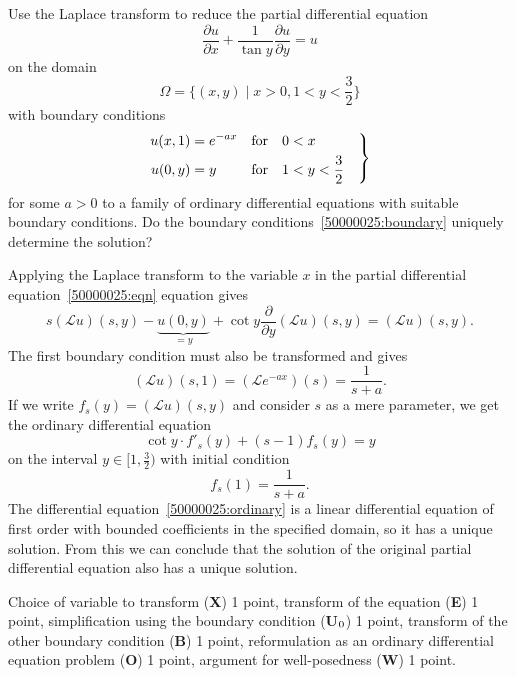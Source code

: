 Use the Laplace transform to reduce the partial differential equation
\begin{equation}
\frac{\partial u}{\partial x}
+
\frac{1}{\tan y}\frac{\partial u}{\partial y}
=
u
\label{50000025:eqn}
\end{equation}
on the domain
\[
\Omega
=
\biggl\{
(x,y)
\;\bigg|\;
x > 0, 1 < y < \frac32
\biggr\}
\]
with boundary conditions
\begin{equation}
\left.
\begin{aligned}
u(x,1) &= e^{-ax} &&\text{for} & 0<\mathstrut&x\\
u(0,y) &= y       &&\text{for} & 1<\mathstrut&y<\frac32
\end{aligned}
\quad\right\}
\label{50000025:boundary}
\end{equation}
for some $a>0$
to a family of ordinary differential equations with suitable boundary
conditions.
Do the boundary conditions~\eqref{50000025:boundary} uniquely determine
the solution?

\begin{loesung}
Applying the Laplace transform to the variable $x$ in the partial
differential equation~\eqref{50000025:eqn} equation gives
\[
s(\mathscr{L}u)(s,y)
-
\underbrace{u(0,y)}_{\displaystyle=y}
+
\cot y \frac{\partial}{\partial y}(\mathscr{L}u)(s,y)
=
(\mathscr{L}u)(s,y).
\]
The first boundary condition must also be transformed and gives
\[
(\mathscr{L}u)(s,1)
=
(\mathscr{L}e^{-ax})(s)
=
\frac{1}{s+a}.
\]
If we write $f_s(y)=(\mathscr{L}u)(s,y)$ and consider $s$ as a mere
parameter, we get the ordinary differential equation
\begin{equation}
\cot y \cdot f'_s(y) 
+(s-1) f_s(y)
=
y
\label{50000025:ordinary}
\end{equation}
on the interval $y\in [1,\frac32)$ with initial condition
\[
f_s(1) = \frac{1}{s+a}.
\]
The differential equation~\eqref{50000025:ordinary} is a linear
differential equation of first order with bounded coefficients
in the specified domain, so it has a unique solution.
From this we can conclude that the solution of the original 
partial differential equation also has a unique solution.
\end{loesung}

\begin{bewertung}
Choice of variable to transform ({\bf X}) 1 point,
transform of the equation ({\bf E}) 1 point,
simplification using the boundary condition ({\bf U}$\mathstrut_0$) 1 point,
transform of the other boundary condition ({\bf B}) 1 point,
reformulation as an ordinary differential equation problem ({\bf O}) 1 point,
argument for well-posedness ({\bf W}) 1 point.
\end{bewertung}
